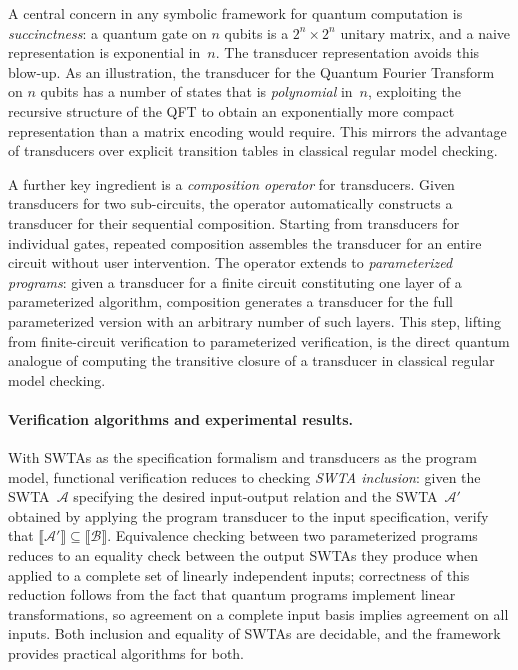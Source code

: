 A central concern in any symbolic framework for quantum computation is
\emph{succinctness}: a quantum gate on $n$ qubits is a $2^n \times 2^n$
unitary matrix, and a naive representation is exponential in~$n$. The
transducer representation avoids this blow-up. As an illustration, the
transducer for the Quantum Fourier Transform on $n$ qubits has a number of
states that is \emph{polynomial} in~$n$, exploiting the recursive structure
of the QFT to obtain an exponentially more compact representation than a
matrix encoding would require. This mirrors the advantage of transducers
over explicit transition tables in classical regular model checking.

A further key ingredient is a \emph{composition operator} for transducers.
Given transducers for two sub-circuits, the operator automatically constructs
a transducer for their sequential composition. Starting from transducers for
individual gates, repeated composition assembles the transducer for an
entire circuit without user intervention. The operator extends to
\emph{parameterized programs}: given a transducer for a finite circuit
constituting one layer of a parameterized algorithm, composition generates
a transducer for the full parameterized version with an arbitrary number
of such layers. This step, lifting from finite-circuit verification to
parameterized verification, is the direct quantum analogue of computing
the transitive closure of a transducer in classical regular model checking.

\paragraph{Verification algorithms and experimental results.}
With SWTAs as the specification formalism and transducers as the program model,
functional verification reduces to checking \emph{SWTA inclusion}: given the
SWTA~$\mathcal{A}$ specifying the desired input-output relation and the
SWTA~$\mathcal{A}'$ obtained by applying the program transducer to the input
specification, verify that $\llbracket \mathcal{A}' \rrbracket \subseteq
\llbracket \mathcal{B} \rrbracket$. Equivalence checking between two
parameterized programs reduces to an equality check between the output SWTAs
they produce when applied to a complete set of linearly independent inputs;
correctness of this reduction follows from the fact that quantum programs
implement linear transformations, so agreement on a complete input basis
implies agreement on all inputs. Both inclusion and equality of SWTAs are
decidable, and the framework provides practical algorithms for both.

